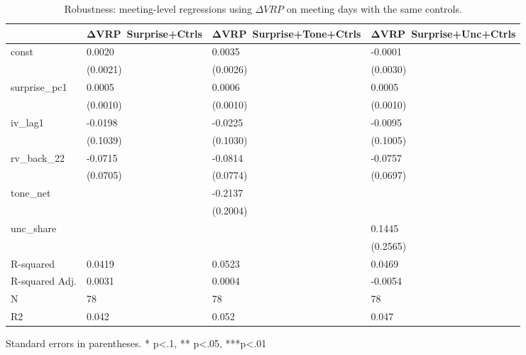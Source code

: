 \begin{table}
\caption{Robustness: meeting-level regressions using $\Delta VRP$ on meeting days with the same controls.}
\label{tab:meet_dvrp_controls}
\begin{center}
\begin{tabular}{llll}
\hline
               & ΔVRP~Surprise+Ctrls & ΔVRP~Surprise+Tone+Ctrls & ΔVRP~Surprise+Unc+Ctrls  \\
\hline
const          & 0.0020              & 0.0035                   & -0.0001                  \\
               & (0.0021)            & (0.0026)                 & (0.0030)                 \\
surprise\_pc1  & 0.0005              & 0.0006                   & 0.0005                   \\
               & (0.0010)            & (0.0010)                 & (0.0010)                 \\
iv\_lag1       & -0.0198             & -0.0225                  & -0.0095                  \\
               & (0.1039)            & (0.1030)                 & (0.1005)                 \\
rv\_back\_22   & -0.0715             & -0.0814                  & -0.0757                  \\
               & (0.0705)            & (0.0774)                 & (0.0697)                 \\
tone\_net      &                     & -0.2137                  &                          \\
               &                     & (0.2004)                 &                          \\
unc\_share     &                     &                          & 0.1445                   \\
               &                     &                          & (0.2565)                 \\
R-squared      & 0.0419              & 0.0523                   & 0.0469                   \\
R-squared Adj. & 0.0031              & 0.0004                   & -0.0054                  \\
N              & 78                  & 78                       & 78                       \\
R2             & 0.042               & 0.052                    & 0.047                    \\
\hline
\end{tabular}
\end{center}
\end{table}
\bigskip
Standard errors in parentheses. \newline 
* p<.1, ** p<.05, ***p<.01